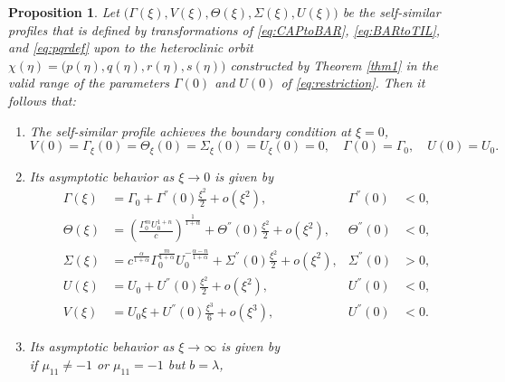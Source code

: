 \documentclass[a4paper,11pt]{article}
\newtheorem{proposition}{Proposition}[section]
\begin{document}
% 
% 
\begin{proposition} \label{prop:ss}
Let $\big(\Gamma(\xi),V(\xi),\Theta(\xi),\Sigma(\xi),U(\xi)\big)$ be the self-similar profiles that is defined by transformations of \eqref{eq:CAPtoBAR}, \eqref{eq:BARtoTIL}, and \eqref{eq:pqrdef} upon to the heteroclinic orbit $\chi(\eta)=\big(p(\eta),q(\eta),r(\eta),s(\eta)\big)$ constructed by Theorem \ref{thm1} in the valid range of the parameters $\Gamma(0)$ and $U(0)$ of \eqref{eq:restriction}. Then it follows that:
 \begin{enumerate}
  \item[(i)] The self-similar profile achieves the boundary condition at $\xi=0$,
    \begin{equation*}
    {V}(0) = \Gamma_\xi(0) = \Theta_\xi(0)=\Sigma_\xi(0) = {U}_\xi(0)=0, \quad \Gamma(0)=\Gamma_0, \quad U(0)=U_0.
  \end{equation*}
  \item[(ii)] Its asymptotic behavior as $\xi \rightarrow 0$ is given by 
  \begin{equation} \label{eq:ss_asymp0}
  \begin{aligned}
    \Gamma(\xi) &= \Gamma_0 + \Gamma^{''}(0)\frac{\xi^2}{2} + o(\xi^2), & \Gamma^{''}(0)&<0,\\
    \Theta(\xi) &= \left(\frac{\Gamma_0^m U_0^{1+n}}{c}\right)^{\frac{1}{1+\alpha}} + \Theta^{''}(0)\frac{\xi^2}{2} + o(\xi^2), & \Theta^{''}(0)&<0,\\
    \Sigma(\xi) &= c^{\frac{\alpha}{1+\alpha}}\Gamma_0^{\frac{m}{1+\alpha}} U_0^{-\frac{\alpha-n}{1+\alpha}}+ \Sigma^{''}(0)\frac{\xi^2}{2} + o(\xi^2), & \Sigma^{''}(0)&>0, \\
    U(\xi) &= U_0 + U^{''}(0)\frac{\xi^2}{2} + o(\xi^2), & U^{''}(0)&<0,\\
    V(\xi) &= U_0\xi + U^{''}(0)\frac{\xi^3}{6} + o(\xi^3), & U^{''}(0)&<0.
  \end{aligned}
  \end{equation}
  \item[(iii)] Its asymptotic behavior as $\xi \rightarrow \infty$ is given by\\
  if $\mu_{11}\ne-1$ or $\mu_{11}=-1$ but $b=\lambda$,

\end{enumerate}
\end{proposition}
\end{document}
